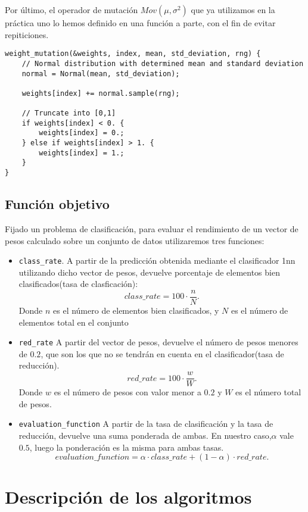 \documentclass[size=a4, parskip=half, titlepage=false, toc=flat, toc=bib, 12pt]{scrartcl}
\begin{document}
Por último, el operador de mutación $Mov(\mu, \sigma^2)$ que ya utilizamos en la práctica uno lo hemos definido en una función a parte, con el fin de evitar repiticiones.

\begin{verbatim}
weight_mutation(&weights, index, mean, std_deviation, rng) {
    // Normal distribution with determined mean and standard deviation
    normal = Normal(mean, std_deviation);

    weights[index] += normal.sample(rng);

    // Truncate into [0,1]
    if weights[index] < 0. {
        weights[index] = 0.;
    } else if weights[index] > 1. {
        weights[index] = 1.;
    }
}
\end{verbatim}
\subsection{Función objetivo}
Fijado un problema de clasificación, para evaluar el rendimiento de un vector de pesos calculado sobre un conjunto de datos utilizaremos tres funciones:
\begin{itemize}
    \item \texttt{class\_rate}. A partir de la predicción obtenida mediante el clasificador 1nn utilizando dicho vector de pesos, devuelve porcentaje de elementos bien clasificados(tasa de clasficación):
    \[
    class\_rate = 100 \cdot \frac{n}{N}
    .\]
Donde $n$ es el número de elementos bien clasificados, y $N$ es el número de elementos total en el conjunto
    \item \texttt{red\_rate} A partir del vector de pesos, devuelve el número de pesos menores de $0.2$, que son los que no se tendrán en cuenta en el clasificador(tasa de reducción).
    \[
    red\_rate = 100 \cdot \frac{w}{W}
    .\]
Donde $w$ es el número de pesos con valor menor a $0.2$ y $W$ es el número total de pesos.
    \item \texttt{evaluation\_function} A partir de la tasa de clasificación y la tasa de reducción, devuelve una suma ponderada de ambas. En nuestro caso,$\alpha$ vale $0.5$, luego la ponderación es la misma para ambas tasas.
    \[
    evaluation\_function = \alpha \cdot class\_rate + (1-\alpha)\cdot red\_rate
    .\]
\end{itemize}

\newpage
\section{Descripción de los algoritmos}
\end{document}
